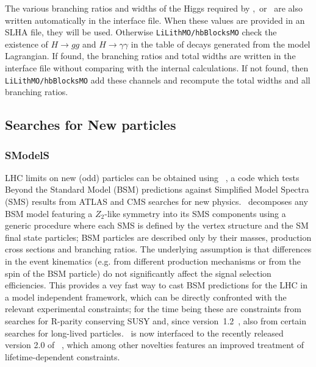 \documentclass[12pt,a4paper]{article}
\begin{document}
The various branching ratios and widths of the Higgs required by   \HB,\HS\ or  \lilith\ are also written automatically in the interface file. When these 
values  are provided in an SLHA file, they will be used. Otherwise {\tt LiLithMO/hbBlocksMO}  check  the existence
of $H\rightarrow gg$  and $H\rightarrow \gamma\gamma$  in the table of decays generated from the model Lagrangian. If found, the branching ratios and total widths are written in the  interface file without comparing  with the internal calculations. If not found, then {\tt LiLithMO/hbBlocksMO} add these channels and  recompute the total widths and all branching ratios.




\subsection{Searches for New particles}

\subsubsection{SModelS}

LHC limits on new (odd) particles can be obtained using \smodels~\cite{Kraml:2013mwa,Ambrogi:2017neo,Ambrogi:2018ujg,smodels20}, 
a code which tests Beyond the Standard Model (BSM) predictions against Simplified Model Spectra (SMS) 
results from ATLAS and CMS searches for new physics.
\smodels\ decomposes any BSM model featuring a ${Z}_2$-like symmetry into its SMS components 
using a generic procedure where each SMS is defined by the vertex structure and the SM final state particles; BSM particles are described only by their masses, production cross sections and branching ratios. 
The underlying assumption is that differences in the event kinematics (e.g. from different production mechanisms or from the spin of the BSM particle) do not significantly affect the signal selection efficiencies. 
This provides a vey fast way to cast BSM predictions for the LHC in a model independent framework, which can be directly confronted with the relevant experimental constraints; for the time being these are constraints from searches for R-parity conserving SUSY and, since version~1.2~\cite{Heisig:2018kfq,Ambrogi:2018ujg}, also from certain searches for long-lived particles. \micro\ is now interfaced to the recently released version 2.0 of \smodels~\cite{smodels20}, which among other novelties features an improved treatment of lifetime-dependent constraints. 
\end{document}
